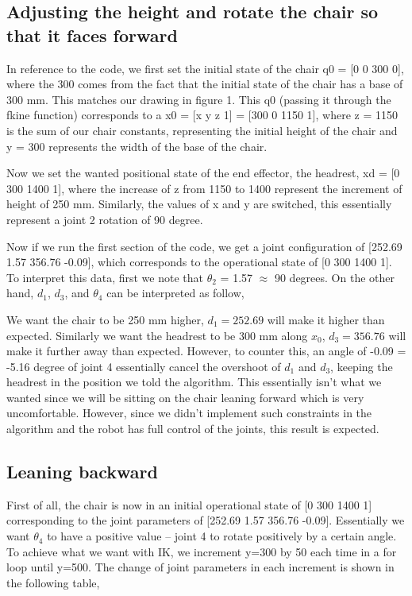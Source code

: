 \documentclass[12pt, letterpaper]{amsart} %
\numberwithin{equation}{section}
\begin{document}
\subsection{Adjusting the height and rotate the chair so that it faces forward}
In reference to the code, we first set the initial state of the chair q0 = [0 0 300 0], where the 300 comes from the fact that the initial state of the chair has a base of 300 mm. This matches our drawing in figure 1. This q0 (passing it through the fkine function) corresponds to a x0 = [x y z 1] = [300 0 1150 1], where z = 1150 is the sum of our chair constants, representing the initial height of the chair and y = 300  represents the width of the base of the chair. \par
Now we set the wanted positional state of the end effector, the headrest, xd = [0 300 1400 1], where the increase of z from 1150 to 1400 represent the increment of height of 250 mm. Similarly, the values of x and y are switched, this essentially represent a joint 2 rotation of 90 degree. \par
Now if we run the first section of the code, we get a joint configuration of [252.69 1.57 356.76 -0.09], which corresponds to the operational state of [0 300 1400 1]. To interpret this data, first we note that $\theta_2$ = 1.57 $\approx$ 90 degrees. On the other hand, $d_1$, $d_3$, and $\theta_4$ can be interpreted as follow, \par
We want the chair to be 250 mm higher, $d_1 = 252.69$ will make it higher than expected. Similarly we want the headrest to be 300 mm along $x_0$, $d_3 = 356.76$ will make it further away than expected. However, to counter this, an angle of -0.09 = -5.16 degree of joint 4 essentially cancel the overshoot of $d_1$ and $d_3$, keeping the headrest in the position we told the algorithm. This essentially isn't what we wanted since we will be sitting on the chair leaning forward which is very uncomfortable. However, since we didn't implement such constraints in the algorithm and the robot has full control of the joints, this result is expected.

\subsection{Leaning backward}
First of all, the chair is now in an initial operational state of [0 300 1400 1] corresponding to the joint parameters of [252.69 1.57 356.76 -0.09]. Essentially we want $\theta_4$ to have a positive value -- joint 4 to rotate positively by a certain angle. To achieve what we want with IK, we increment y=300 by 50 each time in a for loop until y=500. The change of joint parameters in each increment is shown in the following table,
\end{document}
